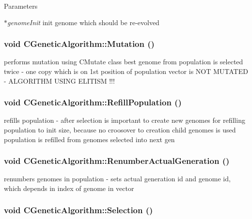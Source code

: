 \begin{DoxyParams}{Parameters}
\item[{\em $\ast$genomeInit}]init genome which should be re-\/evolved \end{DoxyParams}
\hypertarget{classCGeneticAlgorithm_a032d168728e17a9ac47f81844a529410}{
\subsubsection[{Mutation}]{\setlength{\rightskip}{0pt plus 5cm}void CGeneticAlgorithm::Mutation ()}}
\label{classCGeneticAlgorithm_a032d168728e17a9ac47f81844a529410}
performs mutation using CMutate class best genome from population is selected twice -\/ one copy which is on 1st position of population vector is NOT MUTATED -\/ ALGORITHM USING ELITISM !!! \hypertarget{classCGeneticAlgorithm_a5cf2e61a6b805e5575bc1db1552c5aa5}{
\subsubsection[{RefillPopulation}]{\setlength{\rightskip}{0pt plus 5cm}void CGeneticAlgorithm::RefillPopulation ()}}
\label{classCGeneticAlgorithm_a5cf2e61a6b805e5575bc1db1552c5aa5}
refills population -\/ after selection is important to create new genomes for refilling population to init size, because no croosover to creation child genomes is used population is refilled from genomes selected into next gen \hypertarget{classCGeneticAlgorithm_ae889e36cf0759ac986590e8f2756c18c}{
\subsubsection[{RenumberActualGeneration}]{\setlength{\rightskip}{0pt plus 5cm}void CGeneticAlgorithm::RenumberActualGeneration ()}}
\label{classCGeneticAlgorithm_ae889e36cf0759ac986590e8f2756c18c}
renumbers genomes in population -\/ sets actual generation id and genome id, which depends in index of genome in vector \hypertarget{classCGeneticAlgorithm_a44c7a724b1af1370d1e669c84f30775f}{
\subsubsection[{Selection}]{\setlength{\rightskip}{0pt plus 5cm}void CGeneticAlgorithm::Selection ()}}
